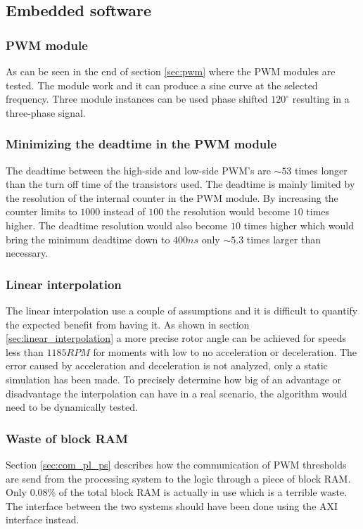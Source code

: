 \subsection{Embedded software}
\subsubsection{PWM module}
As can be seen in the end of section \ref{sec:pwm} where the PWM modules are tested. The module work and it can produce a sine curve at the selected frequency. Three module instances can be used phase shifted $120^\circ$ resulting in a three-phase signal.

\subsubsection{Minimizing the deadtime in the PWM module}
The deadtime between the high-side and low-side PWM's are $\sim 53$ times longer than the turn off time of the transistors used. The deadtime is mainly limited by the resolution of the internal counter in the PWM module. By increasing the counter limits to $1000$ instead of $100$ the resolution would become $10$ times higher. The deadtime resolution would also become $10$ times higher which would bring the minimum deadtime down to $400ns$ only $\sim 5.3$ times larger than necessary.

\subsubsection{Linear interpolation}

The linear interpolation use a couple of assumptions and it is difficult to quantify the expected benefit from having it. As shown in section \ref{sec:linear_interpolation} a more precise rotor angle can be achieved for speeds less than $1185RPM$ for moments with low to no acceleration or deceleration. The error caused by acceleration and deceleration is not analyzed, only a static simulation has been made. To precisely determine how big of an advantage or disadvantage the interpolation can have in a real scenario, the algorithm would need to be dynamically tested.

\subsubsection{Waste of block RAM}
Section \ref{sec:com_pl_ps} describes how the communication of PWM thresholds are send from the processing system to the logic through a piece of block RAM. Only $0.08\%$ of the total block RAM is actually in use which is a terrible waste. The interface between the two systems should have been done using the AXI interface instead.


 
 